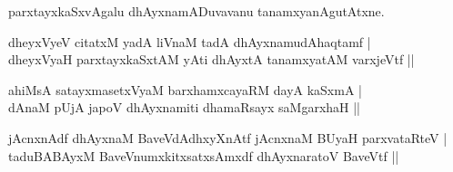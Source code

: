 \begin{entry}
{{parxtayxkaSxvAgalu dhAyxnamADuvavanu tanamxyanAgutAtxne.}}
\medskip
\begin{shl}
dheyxVyeV citatxM yadA liVnaM tadA dhAyxnamudAhaqtamf |\\[1pt]
dheyxVyaH parxtayxkaSxtAM yAti dhAyxtA tanamxyatAM varxjeVtf ||
\end{shl}
\medskip
{}
\medskip
{}
\medskip
\begin{shl}
ahiMsA satayxmasetxVyaM barxhamxcayaRM dayA kaSxmA |\\[1pt]
dAnaM pUjA japoV dhAyxnamiti dhamaRsayx saMgarxhaH ||
\end{shl}
\medskip
{}
\medskip
{}
\medskip
\begin{shl}
jAcnxnAdf dhAyxnaM BaveVdAdhxyXnAtf jAcnxnaM BUyaH parxvataRteV |\\[1pt]
taduBABAyxM BaveVnumxkitxsatxsAmxdf dhAyxnaratoV BaveVtf ||
\end{shl}
\medskip
{}
\medskip
\end{entry}

